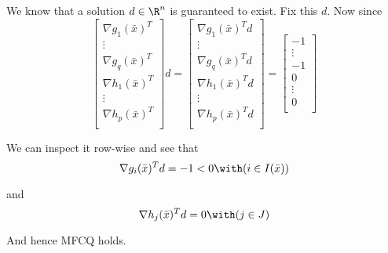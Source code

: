 We know that a solution $d\in\R^n$ is guaranteed to exist. Fix this
$d$. Now since
$$
	\begin{bmatrix}
		\nabla g_1(\bar x)^T \\
		\vdots               \\
		\nabla g_q(\bar x)^T \\
		\nabla h_1(\bar x)^T \\
		\vdots               \\
		\nabla h_p(\bar x)^T \\
	\end{bmatrix}d =
	\begin{bmatrix}
		\nabla g_1(\bar x)^Td \\
		\vdots                \\
		\nabla g_q(\bar x)^Td \\
		\nabla h_1(\bar x)^Td \\
		\vdots                \\
		\nabla h_p(\bar x)^Td \\
	\end{bmatrix} =
	\begin{bmatrix}
		-1     \\
		\vdots \\
		-1     \\
		0      \\
		\vdots \\
		0      \\
	\end{bmatrix}
$$

We can inspect it row-wise and see that
$$
  \nabla g_i(\bar x)^Td=-1<0\with(i\in I(\bar x))
$$

and
$$
  \nabla h_j(\bar x)^Td=0\with(j\in J)
$$

And hence MFCQ holds.
